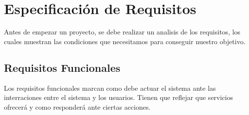 \chapter{Especificación de Requisitos}

Antes de empezar un proyecto, se debe realizar un analisis de los requisitos, los cuales muestran las condiciones
que necesitamos para conseguir nuestro objetivo.

\section{Requisitos Funcionales}

Los requisitos funcionales marcan como debe actuar el sistema ante las interraciones entre el sistema y los usuarios.
Tienen que reflejar que servicios ofrecerá y como responderá ante ciertas acciones.


